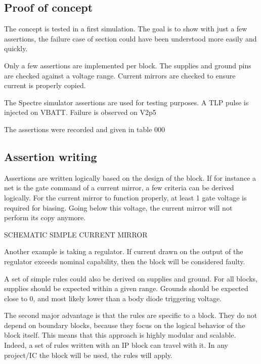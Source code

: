\subsection{Proof of concept}

The concept is tested in a first simulation.
The goal is to show with just a few assertions, the failure case of section \label{sec:failure-case-study} could have been understood more easily and quickly.

Only a few assertions are implemented per block.
The supplies and ground pins are checked against a voltage range.
Current mirrors are checked to ensure current is properly copied.

The Spectre simulator assertions are used for testing purposes.
A TLP pulse is injected on VBATT.
Failure is observed on V2p5

The assertions were recorded and given in table 000


\subsection{Assertion writing}

Assertions are written logically based on the design of the block.
If for instance a net is the gate command of a current mirror, a few criteria can be derived logically.
For the current mirror to function properly, at least 1 gate voltage is required for biasing.
Going below this voltage, the current mirror will not perform its copy anymore.

SCHEMATIC SIMPLE CURRENT MIRROR

Another example is taking a regulator.
If current drawn on the output of the regulator exceeds nominal capability, then the block will be considered faulty.

A set of simple rules could also be derived on supplies and ground.
For all blocks, supplies should be expected within a given range.
Grounds should be expected close to 0, and most likely lower than a body diode triggering voltage.

The second major advantage is that the rules are specific to a block.
They do not depend on boundary blocks, because they focus on the logical behavior of the block itself.
This means that this approach is highly modular and scalable.
Indeed, a set of rules written with an IP block can travel with it.
In any project/IC the block will be used, the rules will apply.

